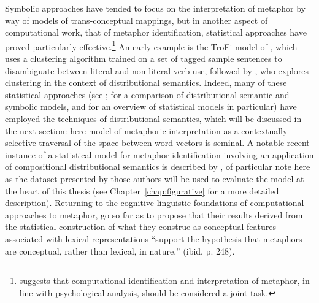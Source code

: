 Symbolic approaches have tended to focus on the interpretation of metaphor by way of models of trans-conceptual mappings, but in another aspect of computational work, that of metaphor identification, statistical approaches have proved particularly effective.\footnote{\cite{Shutova2013} suggests that computational identification and interpretation of metaphor, in line with psychological analysis, should be considered a joint task.}  An early example is the TroFi model of \cite{BirkeEA2006}, which uses a clustering algorithm trained on a set of tagged sample sentences to disambiguate between literal and non-literal verb use, followed by \cite{Utsumi2011}, who explores clustering in the context of distributional semantics.  Indeed, many of these statistical approaches (see \citealt{Dunn2013}; \citealt{TurneyEA2011} for a comparison of distributional semantic and symbolic models, and \citealt{ShutovaEA2013} for an overview of statistical models in particular) have employed the techniques of distributional semantics, which will be discussed in the next section: here  model of metaphoric interpretation as a contextually selective traversal of the space between word-vectors is seminal.  A notable recent instance of a statistical model for metaphor identification involving an application of compositional distributional semantics is described by \cite{GutierrezEA2016}, of particular note here as the dataset presented by those authors will be used to evaluate the model at the heart of this thesis (see Chapter~\ref{chap:figurative} for a more detailed description).  Returning to the cognitive linguistic foundations of computational approaches to metaphor, \cite{TsvetkovEA2014} go so far as to propose that their results derived from the statistical construction of what they construe as conceptual features associated with lexical representations ``support the hypothesis that metaphors are conceptual, rather than lexical, in nature,'' (ibid, p. 248).

